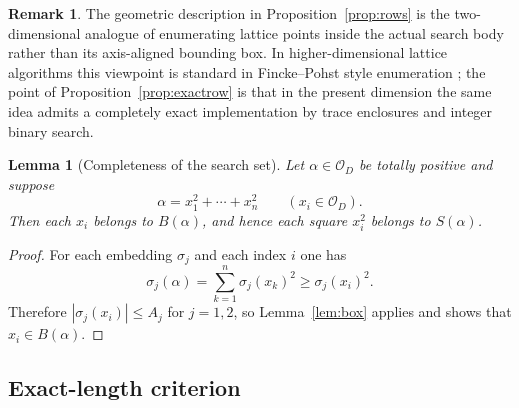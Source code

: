 \documentclass[manuscript,screen]{acmart}
\renewcommand{\le}{\leqslant}
\renewcommand{\ge}{\geqslant}
\theoremstyle{plain}
\newtheorem{lemma}[theorem]{Lemma}
\theoremstyle{definition}
\theoremstyle{nonitalicremark}
\newtheorem{remark}[theorem]{Remark}
\newcommand{\OD}{\mathcal{O}_D}
\newcommand{\sig}{\sigma}
\begin{document}
\begin{remark}\label{rem:fp}
The geometric description in Proposition~\ref{prop:rows} is the two-dimensional analogue of
enumerating lattice points inside the actual search body rather than its axis-aligned bounding box.
In higher-dimensional lattice algorithms this viewpoint is standard in Fincke--Pohst style
enumeration \cite{FP}; the point of Proposition~\ref{prop:exactrow} is that in the present
dimension the same idea admits a completely exact implementation by trace enclosures and integer
binary search.
\end{remark}

\begin{lemma}[Completeness of the search set]\label{lem:complete}
Let $\alpha \in \OD$ be totally positive and suppose
\[
\alpha = x_1^2 + \cdots + x_n^2 \qquad (x_i \in \OD).
\]
Then each $x_i$ belongs to $B(\alpha)$, and hence each square $x_i^2$ belongs to
$S(\alpha)$.
\end{lemma}

\begin{proof}
For each embedding $\sig_j$ and each index $i$ one has
\[
\sig_j(\alpha)=\sum_{k=1}^n \sig_j(x_k)^2 \ge \sig_j(x_i)^2.
\]
Therefore $|\sig_j(x_i)|\le A_j$ for $j=1,2$, so Lemma~\ref{lem:box} applies and shows that
$x_i \in B(\alpha)$.
\end{proof}

\subsection{Exact-length criterion}
\end{document}
